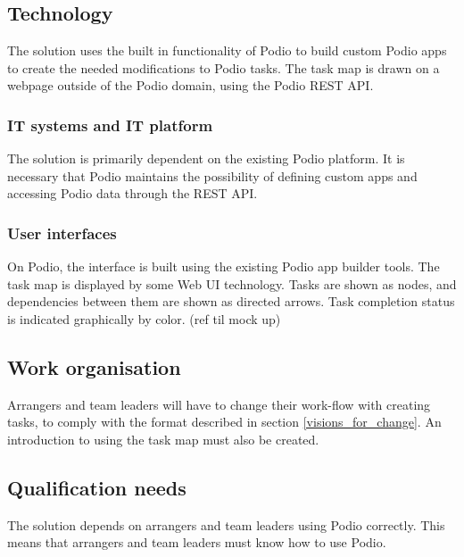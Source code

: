 \subsection{Technology}
\label{sub:technology}
The solution uses the built in functionality of Podio to build custom Podio apps to create the needed modifications to Podio tasks. The task map is drawn on a webpage outside of the Podio domain, using the Podio REST API.

\subsubsection{IT systems and IT platform}
The solution is primarily dependent on the existing Podio platform. It is necessary that Podio maintains the possibility of defining custom apps and accessing Podio data through the REST API.

\subsubsection{User interfaces}
On Podio, the interface is built using the existing Podio app builder tools. The task map is displayed by some Web UI technology. Tasks are shown as nodes, and dependencies between them are shown as directed arrows. Task completion status is indicated graphically by color. (ref til mock up)

\subsection{Work organisation}
\label{sub:work_organisation}
Arrangers and team leaders will have to change their work-flow with creating tasks, to comply with the format described in section \ref{visions_for_change}. An introduction to using the task map must also be created. 

\subsection{Qualification needs}
\label{sub:qualification_needs}
The solution depends on arrangers and team leaders using Podio correctly. This means that arrangers and team leaders must know how to use Podio.

